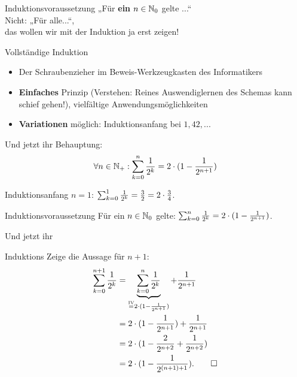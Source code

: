 \begin{frame}{Induktionsvoraussetzung}
	\Huge \centering
	\alert{
		„Für \textbf{ein} $n \in \mathbb{N}_0$ gelte ...“ \\
		\bigskip
		{ \LARGE
		Nicht: „Für alle...“,\\
		das wollen wir mit der Induktion ja erst zeigen!
		}
	}
\end{frame}

\begin{frame}[t]{Vollständige Induktion}
	\begin{itemize}
		\item Der Schraubenzieher im Beweis-Werkzeugkasten des Informatikers
		\item \textbf{Einfaches} Prinzip (Verstehen: Reines Auswendiglernen des Schemas kann schief gehen!), vielfältige Anwendungsmöglichkeiten
		\item \textbf{Variationen} möglich: Induktionsanfang bei $1, 42, ...$
	\end{itemize}
	
\end{frame}




\begin{frame}{Und jetzt ihr}
	Behauptung: \[\forall n \in \mathbb{N}_+ : \sum_{k=0}^{n}{\frac{1}{2^k}} = 2 \cdot (1 - \frac{1}{2^{n+1}})\]
	\begin{block}{Induktionsanfang}
		$n = 1$: $\sum_{k=0}^{1}{\frac{1}{2^k}} = \frac{3}{2} = 2 \cdot \frac{3}{4}$. \; \textbf{\checked}
	\end{block}
	\begin{block}{Induktionsvoraussetzung}
		Für ein $n \in \mathbb{N}_0$ gelte: $\sum_{k=0}^{n}{\frac{1}{2^k}} = 2 \cdot (1 - \frac{1}{2^{n+1}})$.
	\end{block}
\end{frame}

\begin{frame}{Und jetzt ihr}

	\begin{block}{Induktions}
		Zeige die Aussage für $n+1$:\\
		\begin{align*}
			\sum_{k=0}^{n+1}{\frac{1}{2^k}}
				&= \underbrace{\sum_{k=0}^{n}{\frac{1}{2^k}}}_{\stackrel{\text{IV}}{=} 2 \cdot (1 - \frac{1}{2^{n+1}})} + \frac{1}{2^{n+1}}\\
				&= 2 \cdot (1 - \frac{1}{2^{n+1}}) + \frac{1}{2^{n+1}}\\
				&= 2 \cdot (1 - \frac{2}{2^{n+2}} + \frac{1}{2^{n+2}})\\
				&= 2 \cdot (1 - \frac{1}{2^{(n+1)+1}}). \qed
		\end{align*}
	\end{block}
\end{frame}

